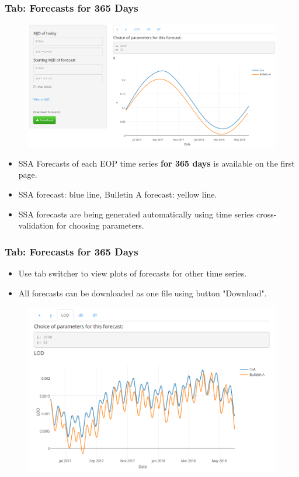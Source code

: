 \documentclass[pdf, unicode, notheorems, xcolor={table}]{beamer}
\begin{document}
\begin{frame}\frametitle{Tab: Forecasts for 365 Days}
	\begin{figure}
		\includegraphics[width=0.9 \linewidth]{forecast_365}
	\end{figure}
	\begin{itemize}
		\item SSA Forecasts of each EOP time series \textbf{for 365 days} is available on the first page.
		\item SSA forecast: blue line, Bulletin A forecast: yellow line.
		\item SSA forecasts are being generated automatically using time series cross-validation for choosing parameters.
	\end{itemize}
\end{frame}

\begin{frame}\frametitle{Tab: Forecasts for 365 Days}
	\begin{itemize}
	\item Use tab switcher to view plots of forecasts for other time series.
	\item All forecasts can be downloaded as one file using button "Download".
	\end{itemize}
	\begin{figure}
		\includegraphics[width=0.9 \linewidth]{tab_lod}
	\end{figure}
\end{frame}
\end{document}
